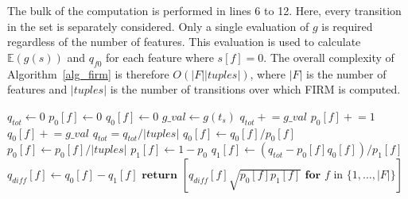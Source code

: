 \documentclass[letterpaper]{article} %
\newcommand{\pluseq}{\mathrel{+}=}
\begin{document}
The bulk of the computation is performed in lines 6 to 12. Here, every transition in the set is separately considered. Only a single evaluation of $g$ is required regardless of the number of features. This evaluation is used to calculate $\mathbb{E}(g(s))$ and $q_{f0}$ for each feature where $s[f] = 0$. The overall complexity of Algorithm~\ref{alg_firm} is therefore $O(|F| |tuples|)$, where $|F|$ is the number of features and $|tuples|$ is the number of transitions over which FIRM is computed.

\begin{algorithm}[t]
\caption{Compute feature importance for all features for given set of transitions.} \label{alg_firm}
\begin{algorithmic}[1]
    \State $q_{tot} \leftarrow 0$ 
      \State $p_0[f] \leftarrow 0$ 
      \State $q_0[f] \leftarrow 0$ 
    \EndFor
      \State $g\_val \leftarrow g(t_s)$
      \State $q_{tot} \pluseq g\_val$ 
         
          \State $p_0[f] \pluseq 1$
          \State $q_0[f] \pluseq g\_val$
        \EndIf
      \EndFor
    \EndFor
    \State $q_{tot} = q_{tot} / |tuples|$ 
     
      \State $q_0[f] \leftarrow q_0[f] / p_0[f]$
      \State $p_0[f] \leftarrow p_0[f] / |tuples|$
      \State $p_1[f] \leftarrow 1 - p_0$
      \State $q_1[f] \leftarrow (q_{tot} - p_0[f] q_0[f]) / p_1[f]$
      \State $q_{diff}[f] \leftarrow q_0[f] - q_1[f]$
    \EndFor
    \State $\textbf{return } [ q_{diff}[f] \sqrt{p_0[f] p_1[f]}
    \textbf{ for } f \textrm{ in } \{1, \ldots, |F|\}]$
  \EndProcedure
\end{algorithmic}
\end{algorithm}
\end{document}
